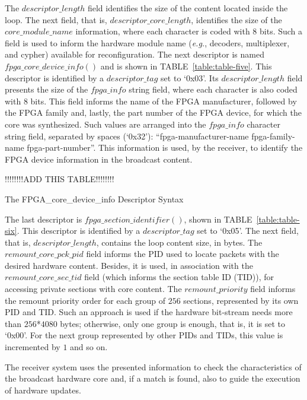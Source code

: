 The $descriptor\_length$ field identifies the size of the content located inside the loop. The next field, that is, $descriptor\_core\_length$, identifies the size of the $core\_module\_name$ information, where each character is coded with 8 bits. Such a field is used to inform the hardware module name ({\it e.g.}, decoders, multiplexer, and cypher) available for reconfiguration. The next descriptor is named $fpga\_core\_device\_info()$  and is shown in TABLE~\ref{table:table-five}. This descriptor is identified by a $descriptor\_tag$ set to `0x03'. Its $descriptor\_length$ field presents the size of the $fpga\_info$ string field, where each character is also coded with 8 bits. This field informs the name of the FPGA manufacturer, followed by the FPGA family and, lastly, the part number of the FPGA device, for which the core was synthesized. Such values are arranged into the $fpga\_info$ character string field, separated by spaces (`0x32'): ``fpga-manufacturer-name fpga-family-name fpga-part-number''. This information is used, by the receiver, to identify the FPGA device information in the broadcast content.

\begin{table}[ht]
\renewcommand{\arraystretch}{1}
\footnotesize{ !!!!!!!!ADD THIS TABLE!!!!!!!! }
\caption{The FPGA\_core\_device\_info Descriptor Syntax}
\label{table:table-five}
\end{table}

The last descriptor is $fpga\_section\_identifier()$, shown in TABLE~\ref{table:table-six}. This descriptor is identified by a $descriptor\_tag$ set to `0x05'. The next field, that is, $descriptor\_length$, contains the loop content size, in bytes. The $remount\_core\_pck\_pid$ field informs the PID used to locate packets with the desired hardware content. Besides, it is used, in association with the $remount\_core\_sec\_tid$ field (which informs the section table ID (TID)), for accessing private sections with core content. The $remount\_priority$ field informs the remount priority order for each group of $256$ sections, represented by its own PID and TID. Such an approach is used if the hardware bit-stream needs more than $256$*$4080$ bytes; otherwise, only one group is enough, that is, it is set to `0x00'. For the next group represented by other PIDs and TIDs, this value is incremented by $1$ and so on. 

The receiver system uses the presented information to check the characteristics of the broadcast hardware core and, if a match is found, also to guide the execution of hardware updates.

